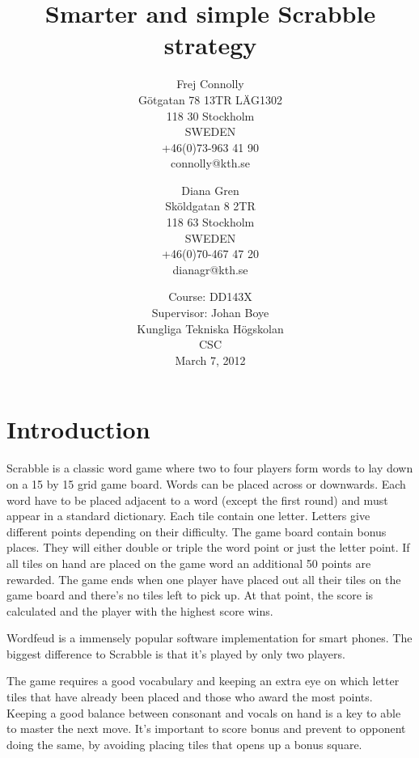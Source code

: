 \documentclass[a4paper, 12pt]{report}
\begin{document}
\title{Smarter and simple Scrabble strategy}
\date{Course: DD143X \\ Supervisor: Johan Boye \\ Kungliga Tekniska Högskolan \\ CSC \\ March 7, 2012}
\author{Frej Connolly \\ Götgatan 78 13TR LÄG1302 \\ 118 30 Stockholm \\ SWEDEN \\ +46(0)73-963 41 90 \\ connolly@kth.se \\
        \and Diana Gren \\ Sköldgatan 8 2TR \\ 118 63 Stockholm \\ SWEDEN \\ +46(0)70-467 47 20 \\ dianagr@kth.se}

\maketitle
\tableofcontents


\chapter{Introduction}
Scrabble is a classic word game where two to four players form words to lay down on a 15 by 15 grid game board. Words can be placed across or downwards. Each word have to be placed adjacent to a word (except the first round) and must appear in a standard dictionary. Each tile contain one letter. Letters give different points depending on their difficulty. The game board contain bonus places. They will either double or triple the word point or just the letter point. If all tiles on hand are placed on the game word an additional 50 points are rewarded. The game ends when one player have placed out all their tiles on the game board and there’s no tiles left to pick up. At that point, the score is calculated and the player with the highest score wins.

Wordfeud is a immensely popular software implementation for smart phones. The biggest difference to Scrabble is that it’s played by only two players.

The game requires a good vocabulary and keeping an extra eye on which letter tiles that have already been placed and those who award the most points. Keeping a good balance between consonant and vocals on hand is a key to able to master the next move. It’s important to score bonus and prevent to opponent doing the same, by avoiding placing tiles that opens up a bonus square.
\end{document}
